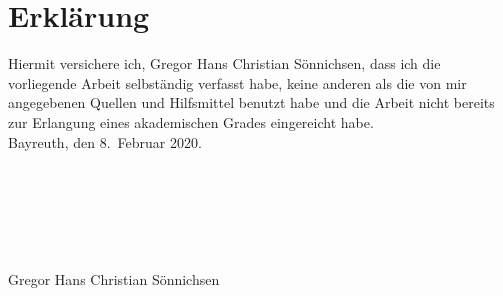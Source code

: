 \documentclass[a4paper, oneside, 11pt]{book}
\theoremstyle{definition}
\theoremstyle{remark}
\begin{document}
	\renewcommand{\contentsname}{Table of Contents}
	\tableofcontents
	
	\mainmatter
	
	
	
	
	
	
	
	\appendix
	
	
	
	\nocite{*}
	
	
	
	\chapter*{Erklärung}
	
	Hiermit versichere ich, Gregor Hans Christian Sönnichsen, dass ich die vorliegende Arbeit selbständig verfasst habe, keine anderen als die von mir angegebenen Quellen und Hilfsmittel benutzt habe und die Arbeit nicht  bereits zur Erlangung eines akademischen Grades eingereicht habe. \\
	
	\noindent Bayreuth, den 8.\ Februar 2020. \\\\\\\\\\\\\\
	\noindent Gregor Hans Christian Sönnichsen
\end{document}
